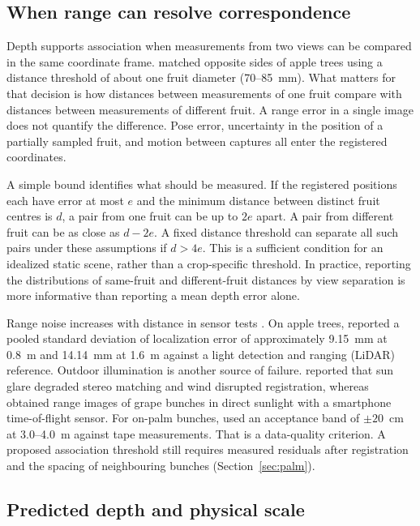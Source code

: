\subsection{When range can resolve correspondence}

Depth supports association when measurements from two views can be compared in the same coordinate frame. \citet{wei2025multi} matched opposite sides of apple trees using a distance threshold of about one fruit diameter (70--85~mm). What matters for that decision is how distances between measurements of one fruit compare with distances between measurements of different fruit. A range error in a single image does not quantify the difference. Pose error, uncertainty in the position of a partially sampled fruit, and motion between captures all enter the registered coordinates.

A simple bound identifies what should be measured. If the registered positions each have error at most \(e\) and the minimum distance between distinct fruit centres is \(d\), a pair from one fruit can be up to \(2e\) apart. A pair from different fruit can be as close as \(d-2e\). A fixed distance threshold can separate all such pairs under these assumptions if \(d>4e\). This is a sufficient condition for an idealized static scene, rather than a crop-specific threshold. In practice, reporting the distributions of same-fruit and different-fruit distances by view separation is more informative than reporting a mean depth error alone.

Range noise increases with distance in sensor tests \citep{neupane2021evaluation}. On apple trees, \citet{fu2026mt} reported a pooled standard deviation of localization error of approximately 9.15~mm at 0.8~m and 14.14~mm at 1.6~m against a light detection and ranging (LiDAR) reference. Outdoor illumination is another source of failure. \citet{qureshi2023seeing} reported that sun glare degraded stereo matching and wind disrupted registration, whereas \citet{parr2023grape} obtained range images of grape bunches in direct sunlight with a smartphone time-of-flight sensor. For on-palm bunches, \citet{goh2025outdoor} used an acceptance band of \(\pm 20\)~cm at 3.0--4.0~m against tape measurements. That is a data-quality criterion. A proposed association threshold still requires measured residuals after registration and the spacing of neighbouring bunches (Section~\ref{sec:palm}).

\subsection{Predicted depth and physical scale}

